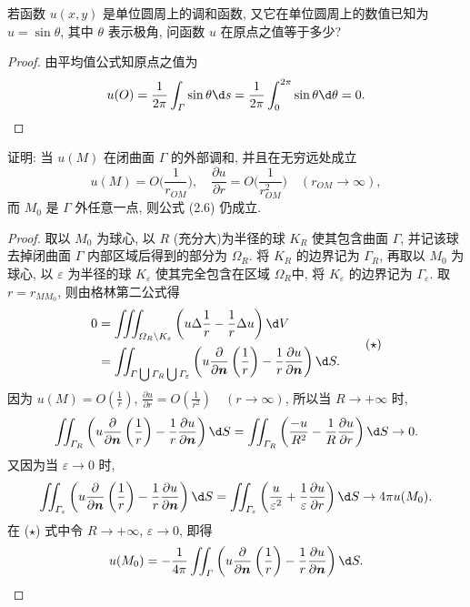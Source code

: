 \begin{exercise}
  若函数 $u(x,y)$ 是单位圆周上的调和函数, 又它在单位圆周上的数值已知为 $u=\sin\theta$,
  其中 $\theta$ 表示极角, 问函数 $u$ 在原点之值等于多少?
\end{exercise}

\begin{proof}
  由平均值公式知原点之值为
  \[u(O) = \frac{1}{2\pi}\int_{\varGamma}\sin\theta\d s
    = \frac{1}{2\pi}\int_0^{2\pi}\sin\theta\d\theta = 0.\qedhere\]
\end{proof}


\begin{exercise}[4]
  证明: 当 $u(M)$ 在闭曲面 $\varGamma$ 的外部调和, 并且在无穷远处成立
  \[u(M) = O\biggl(\frac{1}{r_{OM}}\biggr),\quad
    \frac{\partial u}{\partial r} = O\biggl(\frac{1}{r_{OM}^2}\biggr)\quad
    (r_{OM}\to\infty),\]
  而 $M_0$ 是 $\varGamma$ 外任意一点, 则公式 (2.6) 仍成立.
\end{exercise}

\begin{proof}
  取以 $M_0$ 为球心, 以 $R$ (充分大)为半径的球 $K_R$ 使其包含曲面 $\varGamma$,
  并记该球去掉闭曲面 $\varGamma$ 内部区域后得到的部分为 $\varOmega_R$. 将 $K_R$ 的边界记为 $\varGamma_R$,
  再取以 $M_0$ 为球心, 以 $\varepsilon$ 为半径的球 $K_{\varepsilon}$ 使其完全包含在区域 $\varOmega_R$中,
  将 $K_{\varepsilon}$ 的边界记为 $\varGamma_{\varepsilon}$.
  取 $r=r_{MM_0}$, 则由格林第二公式得
  \begin{equation}
    \begin{aligned}
    0 & = \iiint_{\varOmega_R\setminus K_{\varepsilon}}\left(u\Delta\frac{1}{r}
        - \frac{1}{r}\Delta u\right)\d V \\
      & = \iint_{\varGamma\bigcup\varGamma_R\bigcup\varGamma_{\varepsilon}}\left(u\frac{\partial}{\partial\bm{n}}\left(\frac{1}{r}\right)-\frac{1}{r}\frac{\partial u}{\partial\bm{n}}\right)\d S.
    \end{aligned} \tag{$\star$}
  \end{equation}
  因为 $\displaystyle u(M)=O\left(\frac{1}{r}\right)$, $\displaystyle\frac{\partial u}{\partial r}=O\left(\frac{1}{r^2}\right)\quad(r\to\infty)$,
  所以当 $R\to +\infty$ 时,
  \[\iint_{\varGamma_R}\left(u\frac{\partial}{\partial\bm{n}}\left(\frac{1}{r}\right)
    - \frac{1}{r}\frac{\partial u}{\partial\bm{n}}\right)\d S
    = \iint_{\varGamma_R}\left(\frac{-u}{R^2}-\frac{1}{R}\frac{\partial u}{\partial r}\right)\d S\to 0.\]
  又因为当 $\varepsilon\to 0$ 时,
  \[\iint_{\varGamma_{\varepsilon}}\left(u\frac{\partial}{\partial\bm{n}}\left(\frac{1}{r}\right)
    - \frac{1}{r}\frac{\partial u}{\partial\bm{n}}\right)\d S
    = \iint_{\varGamma_{\varepsilon}}\left(\frac{u}{\varepsilon^2}
    + \frac{1}{\varepsilon}\frac{\partial u}{\partial r}\right)\d S
    \to 4\pi u(M_0).\]
  在 ($\star$) 式中令 $R\to +\infty$, $\varepsilon\to 0$, 即得
  \[u(M_0)
  =-\frac{1}{4\pi}\iint_{\varGamma}\left(u\frac{\partial}{\partial\bm{n}}\left(\frac{1}{r}\right)
  -\frac{1}{r}\frac{\partial u}{\partial\bm{n}}\right)\d S. \qedhere\]
\end{proof}


